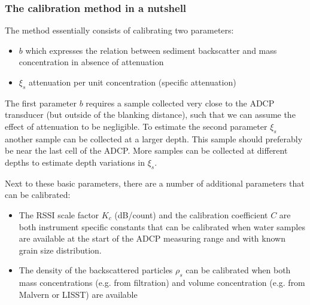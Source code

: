 \documentclass[]{artikel3}
\begin{document}
\subsubsection{The calibration method in a nutshell}
The method essentially consists of calibrating two parameters:
\begin{itemize}
  \item $b$ which expresses the relation between sediment backscatter and mass concentration in absence of attenuation
  \item $\xi_s$ attenuation per unit concentration (specific attenuation)
\end{itemize}
The first parameter $b$ requires a sample collected very close to the ADCP transducer (but outside of the blanking distance), such that we can assume the effect of attenuation to be negligible.
To estimate the second parameter $\xi_s$ another sample can be collected at a larger depth. This sample should preferably be near the last cell of the ADCP. More samples can be collected at different depths to estimate depth variations in $\xi_s$.

Next to these basic parameters, there are a number of additional parameters that can be calibrated:
\begin{itemize}
  \item The RSSI scale factor $K_c$ (dB/count) and the calibration coefficient $C$ are both instrument specific constants that can be calibrated when water samples are available at the start of the ADCP measuring range and with known grain size distribution.
  \item The density of the backscattered particles $\rho_s$ can be calibrated when both mass concentrations (e.g. from filtration) and volume concentration (e.g. from Malvern or LISST) are available
\end{itemize}
\end{document}
